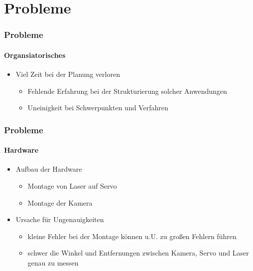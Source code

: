 \documentclass[xcolor=dvipsnames]{beamer}
\begin{document}

\section{Probleme}
\begin{frame}
	\frametitle{Probleme}
	\framesubtitle{Organsiatorisches}

	\begin{itemize}
		\item Viel Zeit bei der Planung verloren
		\begin{itemize}
			\item Fehlende Erfahrung bei der Strukturierung solcher Anwendungen
			\item Uneinigkeit bei Schwerpunkten und Verfahren
		\end{itemize}
	\end{itemize}

\end{frame}


\begin{frame}
	\frametitle{Probleme}
	\framesubtitle{Hardware}

	\begin{itemize}
		\item Aufbau der Hardware
		\begin{itemize}
			\item Montage von Laser auf Servo
			\item Montage der Kamera
		\end{itemize}
		\item Ursache für Ungenauigkeiten
		\begin{itemize}
			\item kleine Fehler bei der Montage können u.U. zu großen Fehlern führen
			\item schwer die Winkel und Entfernungen zwischen Kamera, Servo und Laser genau zu messen 
		\end{itemize}
	\end{itemize}

\end{frame}
\end{document}

